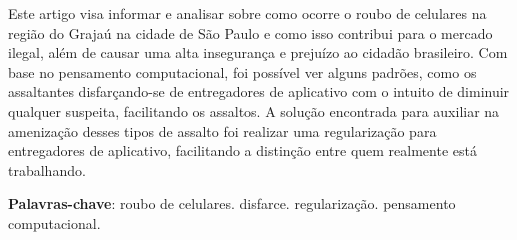 \documentclass[
	article,			
	12pt,				
	oneside,			
	a4paper,						
	brazil,				
	sumario=tradicional
	]{abntex2}
\begin{document}
\frenchspacing 
\maketitle

\begin{resumoumacoluna}
    
	Este artigo visa informar e analisar sobre como ocorre o roubo de celulares na região
	do Grajaú na cidade de São Paulo e como isso contribui para o mercado ilegal, além de 
	causar uma alta insegurança e prejuízo ao cidadão brasileiro. Com base no pensamento 
	computacional, foi possível ver alguns padrões, como os assaltantes disfarçando-se de
	entregadores de aplicativo com o intuito de diminuir qualquer suspeita, facilitando
	os assaltos. A solução encontrada para auxiliar na amenização desses tipos de assalto
	foi realizar uma regularização para entregadores de aplicativo, facilitando a
	distinção entre quem realmente está trabalhando.
    
    \vspace{\onelineskip}
    
    \noindent
    \textbf{Palavras-chave}: roubo de celulares. disfarce. regularização. pensamento computacional.
\end{resumoumacoluna}

\textual

\newpage
















\newpage

\end{document}
